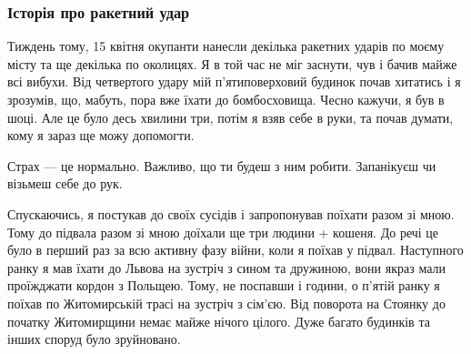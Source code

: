  
 
 
 
 

\subsubsection{Історія про ракетний удар}

Тиждень тому, 15 квітня окупанти нанесли декілька ракетних ударів по моєму
місту та ще декілька по околицях. Я в той час не міг заснути, чув і бачив майже
всі вибухи. Від четвертого удару мій п'ятиповерховий будинок почав хитатись і я
зрозумів, що, мабуть, пора вже їхати до бомбосховища. Чесно кажучи, я був в
шоці. Але це було десь хвилини три, потім я взяв себе в руки, та почав думати,
кому я зараз ще можу допомогти.

Страх — це нормально. Важливо, що ти будеш з ним робити. Запанікуєш чи візьмеш
себе до рук.


Спускаючись, я постукав до своїх сусідів і запропонував поїхати разом зі мною.
Тому до підвала разом зі мною доїхали ще три людини + кошеня. До речі це було в
перший раз за всю активну фазу війни, коли я поїхав у підвал. Наступного ранку
я мав їхати до Львова на зустріч з сином та дружиною, вони якраз мали
проїжджати кордон з Польщею. Тому, не поспавши і години, о п'ятій ранку я
поїхав по Житомирській трасі на зустріч з сім'єю. Від поворота на Стоянку до
початку Житомирщини немає майже нічого цілого. Дуже багато будинків та інших
споруд було зруйновано.
